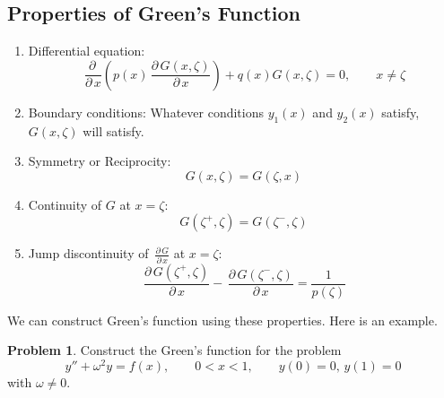\documentclass[12pt,a4paper]{article}
\theoremstyle{remark}
\theoremstyle{definition}
\newtheorem{prob}{Problem}[section]
\newcommand{\pardx}[1]{\,\frac{\partial\, #1}{\partial\, x}}
\begin{document}
\subsection{Properties of Green's Function}
\begin{enumerate}
    \item Differential equation:
          \[\pardx{}\left( p(x)\pardx{G(x,\zeta)} \right)+q(x)G(x,\zeta)=0,\qquad x\neq \zeta\]
    \item Boundary conditions: Whatever conditions $ y_1(x) $ and $ y_2(x) $ satisfy, $ G(x,\zeta) $ will satisfy.
    \item Symmetry or Reciprocity:
          \[G(x,\zeta)=G(\zeta,x)\]
    \item Continuity of $ G $ at $ x =\zeta$:
          \[G(\zeta^+,\zeta)=G(\zeta^-,\zeta)\]
    \item Jump discontinuity of $ \pardx{G} $ at $ x=\zeta $:
          \[\pardx{G(\zeta^+,\zeta)}-\pardx{G(\zeta^-,\zeta)}=\frac{1}{p(\zeta)}\]
\end{enumerate}
We can construct Green's function using these properties. Here is an example.
\newpage
\begin{prob}
    Construct the Green's function for the problem
    \[y''+\omega^2y=f(x),\qquad0<x<1,\qquad y(0)=0,\,y(1)=0\]
    with $ \omega\neq 0 $.
\end{prob}
\end{document}
